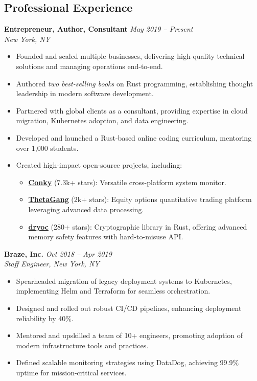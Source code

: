 \documentclass[margin,line]{resume}
\begin{document}
\begin{resume}
\vspace{10pt}

\section{Professional Experience}

\textbf{Entrepreneur, Author, Consultant} \hfill \textit{May 2019 -- Present} \\
\textit{New York, NY}
\begin{itemize}[leftmargin=0.5cm]
    \item Founded and scaled multiple businesses, delivering high-quality technical solutions and managing operations end-to-end.
    \item Authored \textit{two best-selling books} on Rust programming, establishing thought leadership in modern software development.
    \item Partnered with global clients as a consultant, providing expertise in cloud migration, Kubernetes adoption, and data engineering.
    \item Developed and launched a Rust-based online coding curriculum, mentoring over 1,000 students.
    \item Created high-impact open-source projects, including:
        \begin{itemize}
            \item \href{https://github.com/brndnmtthws/conky/}{\textbf{Conky}} (7.3k+ stars): Versatile cross-platform system monitor.
            \item \href{https://github.com/brndnmtthws/thetagang/}{\textbf{ThetaGang}} (2k+ stars): Equity options quantitative trading platform leveraging advanced data processing.
            \item \href{https://github.com/brndnmtthws/dryoc/}{\textbf{dryoc}} (280+ stars): Cryptographic library in Rust, offering advanced memory safety features with hard-to-misuse API.
        \end{itemize}
\end{itemize}

\textbf{Braze, Inc.} \hfill \textit{Oct 2018 -- Apr 2019} \\
\textit{Staff Engineer, New York, NY}
\begin{itemize}[leftmargin=0.5cm]
    \item Spearheaded migration of legacy deployment systems to Kubernetes, implementing Helm and Terraform for seamless orchestration.
    \item Designed and rolled out robust CI/CD pipelines, enhancing deployment reliability by 40\%.
    \item Mentored and upskilled a team of 10+ engineers, promoting adoption of modern infrastructure tools and practices.
    \item Defined scalable monitoring strategies using DataDog, achieving 99.9\% uptime for mission-critical services.
\end{itemize}


\end{resume}
\end{document}
